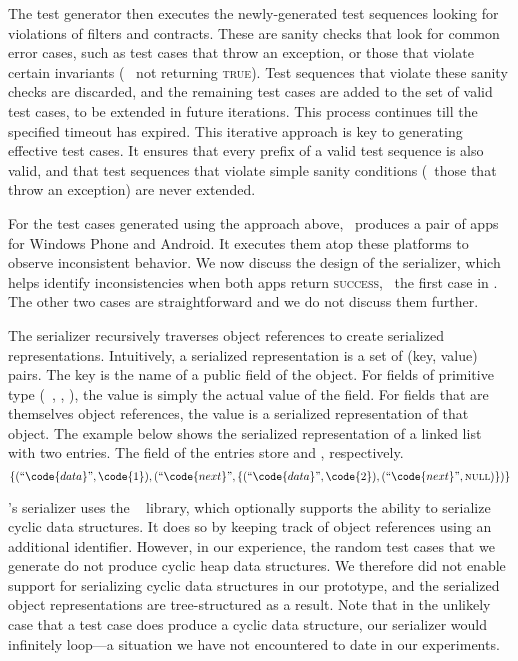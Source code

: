 The test generator then executes the newly-generated test sequences looking for
violations of filters and contracts. These are sanity checks that look for
common error cases, such as test cases that throw an exception, or those that
violate certain invariants (\eg~ not returning \textsc{true}).
Test sequences that violate these sanity checks are discarded, and the
remaining test cases are added to the set of valid test cases, to be extended
in future iterations.  This process continues till the specified timeout has
expired.  This iterative approach is key to generating effective test cases. It
ensures that every prefix of a valid test sequence is also valid, and that test
sequences that violate simple sanity conditions (\eg~those that throw an
exception) are never extended.

%
For the test cases generated using the approach above, \tool\ produces a pair
of apps for Windows Phone and Android. It executes them atop these platforms to
observe inconsistent behavior. We now discuss the design of the serializer,
which helps identify inconsistencies when both apps return \textsc{success},
\ie~the first case in . The other two cases
are straightforward and we do not discuss them further.

The serializer recursively traverses object references to create serialized
representations. Intuitively, a serialized representation is a set of
(\textsf{key}, \textsf{value}) pairs. The \textsf{key} is the name of a public
field of the object. For fields of primitive type (\eg~, ,
), the \textsf{value} is simply the actual value of the field. For
fields that are themselves object references, the value is a serialized
representation of that object. The example below shows the serialized
representation of a linked list with two entries. The  field of the
entries store  and , respectively.
%
$$
\{
	(``\code{data}", \code{1}),
	(``\code{next}", \{(``\code{data}", \code{2}), 
	                   (``\code{next}", \textsc{null})
	                 \})
\}
$$

\tool's serializer uses the ~\cite{jsonnet} library, which
optionally supports the ability to serialize cyclic data structures. It does so
by keeping track of object references using an additional identifier. However,
in our experience, the random test cases that we generate do not produce cyclic
heap data structures. We therefore did not enable support for serializing
cyclic data structures in our prototype, and the serialized object
representations are tree-structured as a result. Note that in the unlikely case
that a test case does produce a cyclic data structure, our serializer would
infinitely loop---a situation we have not encountered to date in our
experiments.

